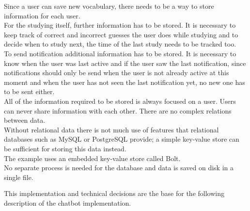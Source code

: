 Since a user can save new vocabulary,
there needs to be a way to store information for each user.
\\
For the studying itself, further information has to be stored.
It is necessary to keep track of correct and incorrect guesses the user does while studying
and to decide when to study next, the time of the last study needs to be tracked too.
\\

To send notification additional information has to be stored.
It is necessary to know when the user was last active and if the user saw the last notification,
since notifications should only be send when the user is not already active at this moment
and when the user has not seen the last notification yet, no new one has to be sent either.
\\

All of the information required to be stored is always focused on a user.
Users can never share information with each other.
There are no complex relations between data.
\\
Without relational data there is not much use of features that relational databases such as MySQL or PostgreSQL provide;
a simple key-value store can be sufficient for storing this data instead.
\\
The example uses an embedded key-value store called Bolt\cite{boltdb}.
\\
No separate process is needed for the database and data is saved on disk in a single file.



This implementation and technical decisions are the base for the following description of the chatbot implementation.
